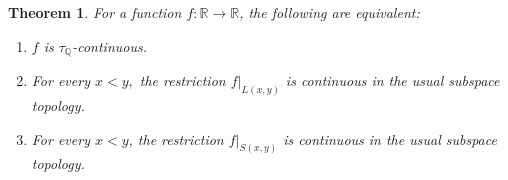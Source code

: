 \documentclass[11pt]{amsart} %
\newtheorem{theorem}{Theorem}[section]
\theoremstyle{definition}
\newcommand{\Q}{\mathbb{Q}}
\begin{document}
\begin{theorem}%
For a function $f:\mathbb{R}\rightarrow\mathbb{R}$, the following are equivalent:
\begin{enumerate}
\item[(1)] $f$ is $\tau_{\Q}$-continuous.
\item[(2)] For every $x<y,$ the restriction $f|_{L(x,y)}$ is continuous in the usual subspace topology.
\item[(3)] For every $x<y$, the restriction $f|_{S(x,y)}$ is continuous in the usual subspace topology.
\end{enumerate}
\label{thm:qcont-char}
\end{theorem}
\end{document}
